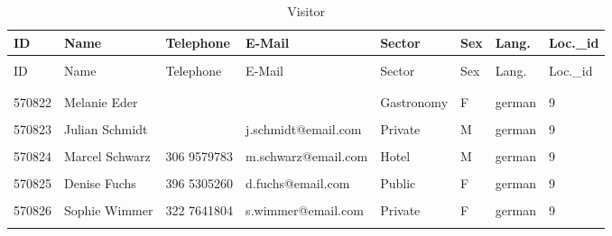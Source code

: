 \documentclass[letterpaper,12pt]{article}
\begin{document}
\begingroup
\renewcommand\arraystretch{0.5}
\begin{longtable}{p{1.3cm}p{1.6cm}p{1.8cm}p{3.6cm}p{2cm}p{.7cm}p{1.2cm}p{1.5cm}}
        \caption{Visitor} \\
        ID & Name & Telephone & E-Mail & Sector & Sex & Lang. & Loc.\_id \\
        \endfirsthead \\
        ID & Name & Telephone & E-Mail & Sector & Sex & Lang. & Loc.\_id \\
        \endhead \\
        \hline \\
        \color{red} 570822 & Melanie Eder &  &  & \color{red} Gastronomy & F & german & 9 \\
        \hline \\
        570823 & Julian Schmidt &  & j.schmidt@email.com & \color{red} Private & M & german & 9 \\
        \hline \\
        570824 & Marcel Schwarz & 306 9579783 & m.schwarz@email.com & \color{red} Hotel & M & german & 9 \\
        \hline \\
        570825 & Denise Fuchs & 396 5305260 & d.fuchs@email.com & \color{red} Public & F & german & 9 \\
        \hline \\
        570826 & Sophie Wimmer & 322 7641804 & s.wimmer@email.com & \color{red} Private & F & german & 9 \\
        \hline \\
\end{longtable} 
\endgroup
\end{document}
